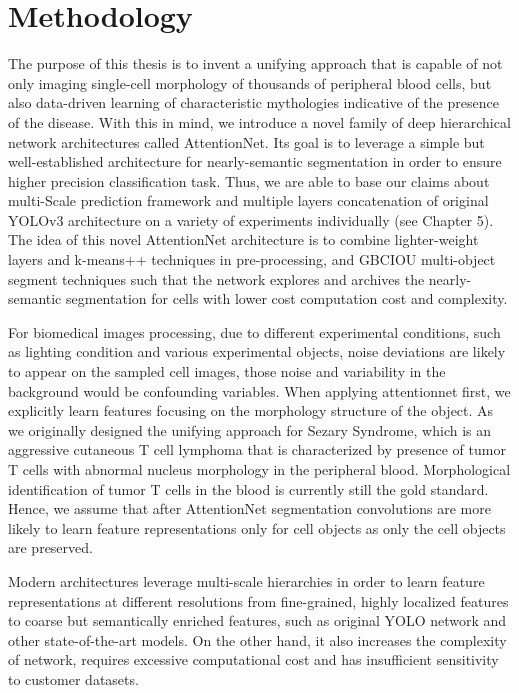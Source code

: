 \chapter{Methodology}
\label{sec:Methodology}
The purpose of this thesis is to invent a unifying approach that is capable of not only imaging single-cell morphology of thousands of peripheral blood cells, but also data-driven learning of characteristic mythologies indicative of the presence of the disease. With this in mind, we introduce a novel family of deep hierarchical network architectures called AttentionNet. Its goal is to leverage a simple but well-established architecture for nearly-semantic segmentation in order to ensure 
higher precision classification task. Thus, we are able to base our claims about multi-Scale prediction framework and multiple layers concatenation of original YOLOv3 architecture on a variety of experiments individually (see Chapter 5). The idea of this novel AttentionNet architecture is to combine lighter-weight layers  and k-means++ techniques in pre-processing, and GBCIOU multi-object segment techniques such that the network explores and archives the nearly-semantic segmentation for cells with lower cost computation cost and complexity.

For biomedical images processing, due to different experimental conditions, such as lighting condition and various  experimental objects, noise deviations are likely to appear on the sampled cell images\cite{6}\cite{7}, those noise and variability in the background would be confounding variables.
When applying attentionnet first, we explicitly learn features focusing on the morphology structure of the object. As we originally designed the unifying approach for Sezary Syndrome, which is an aggressive cutaneous T cell lymphoma that is characterized by presence of tumor T cells with abnormal nucleus morphology in the peripheral blood. Morphological identification of tumor T cells in the blood is currently still the gold standard.
Hence, we assume that after AttentionNet segmentation convolutions are more likely to learn feature representations only for cell objects as only the cell objects are preserved.

Modern architectures leverage multi-scale hierarchies in order to learn feature representations at different resolutions from fine-grained, highly localized features to coarse but semantically enriched features, such as original YOLO network and other state-of-the-art models. On the other hand, it also increases  the complexity of network, requires excessive computational cost and has insufficient sensitivity to customer datasets.

